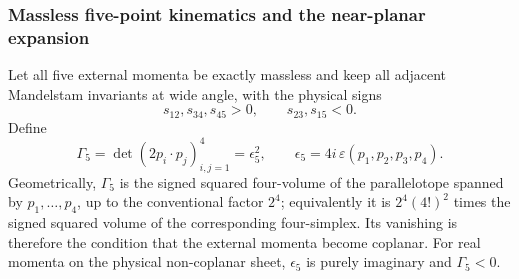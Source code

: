 \documentclass[a4paper,11pt]{article}
\begin{document}
\subsubsection{Massless five-point kinematics and the near-planar expansion}
\label{sec:five-point-near-planar}

Let all five external momenta be exactly massless and keep all adjacent
Mandelstam invariants at wide angle, with the physical signs
\begin{equation}
 s_{12},s_{34},s_{45}>0,\qquad s_{23},s_{15}<0.
 \label{eq:five-wide-angle-signs}
\end{equation}
Define
\begin{equation}
 \Gamma_5=\det(2p_i\!\cdot p_j)_{i,j=1}^{4}=\epsilon_5^2,
 \qquad \epsilon_5=4i\,\varepsilon(p_1,p_2,p_3,p_4).
 \label{eq:five-gram-definition}
\end{equation}
Geometrically, \(\Gamma_5\) is the signed squared four-volume of the
parallelotope spanned by \(p_1,\ldots,p_4\), up to the conventional factor
\(2^4\); equivalently it is \(2^4(4!)^2\) times the signed squared volume of
the corresponding four-simplex.  Its vanishing is therefore the condition
that the external momenta become coplanar.  For real momenta on the physical
non-coplanar sheet, \(\epsilon_5\) is purely imaginary and \(\Gamma_5<0\).
\end{document}
